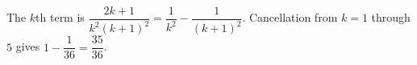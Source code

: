 The $k$th term is $\dfrac{2k+1}{k^2(k+1)^2}=\dfrac{1}{k^2}-\dfrac{1}{(k+1)^2}$. Cancellation from $k=1$ through $5$ gives $1-\dfrac{1}{36}=\boxed{\dfrac{35}{36}}$.
